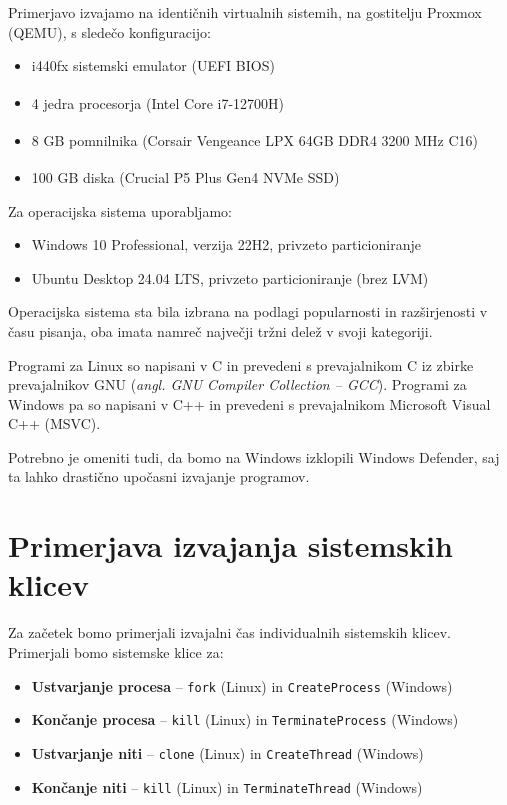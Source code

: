 \documentclass[a4paper,12pt,openright]{book}
\begin{document}
Primerjavo izvajamo na identičnih virtualnih sistemih, na gostitelju Proxmox (QEMU), s sledečo konfiguracijo:
\begin{itemize}
	\item i440fx sistemski emulator (UEFI BIOS)
	\item 4 jedra procesorja (Intel\textsuperscript{\textregistered} Core\textsuperscript{\texttrademark} i7-12700H)
	\item 8 GB pomnilnika (Corsair\textsuperscript{\textregistered} Vengeance\textsuperscript{\textregistered} LPX 64GB DDR4 3200 MHz C16)
	\item 100 GB diska (Crucial\textsuperscript{\textregistered} P5 Plus Gen4 NVMe SSD)
\end{itemize}

Za operacijska sistema uporabljamo:
\begin{itemize}
	\item Windows 10 Professional, verzija 22H2, privzeto particioniranje
	\item Ubuntu Desktop 24.04 LTS, privzeto particioniranje (brez LVM)
\end{itemize}
Operacijska sistema sta bila izbrana na podlagi popularnosti in razširjenosti v času pisanja, oba imata namreč največji tržni delež v svoji kategoriji.

Programi za Linux so napisani v C in prevedeni s prevajalnikom C iz zbirke prevajalnikov GNU (\textit{angl. GNU Compiler Collection -- GCC}).
Programi za Windows pa so napisani v C++ in prevedeni s prevajalnikom Microsoft Visual C++ (MSVC).

Potrebno je omeniti tudi, da bomo na Windows izklopili Windows Defender, saj ta lahko drastično upočasni izvajanje programov.

\section{Primerjava izvajanja sistemskih klicev}

Za začetek bomo primerjali izvajalni čas individualnih sistemskih klicev.
Primerjali bomo sistemske klice za:
\begin{itemize}
	\item \textbf{Ustvarjanje procesa} -- \texttt{fork} (Linux) in \texttt{CreateProcess} (Windows)
	\item \textbf{Končanje procesa} -- \texttt{kill} (Linux) in \texttt{TerminateProcess} (Windows)
	\item \textbf{Ustvarjanje niti} -- \texttt{clone} (Linux) in \texttt{CreateThread} (Windows)
	\item \textbf{Končanje niti} -- \texttt{kill} (Linux) in \texttt{TerminateThread} (Windows)
\end{itemize}
\end{document}
